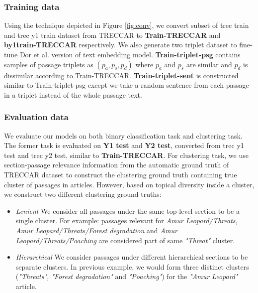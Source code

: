\documentclass[sigconf,authordraft]{acmart}
\begin{document}

\subsubsection{Training data} Using the technique depicted in Figure \ref{fig:conv}, we convert subset of trec train and trec y1 train dataset from TRECCAR to \textbf{Train-TRECCAR} and \textbf{by1train-TRECCAR} respectively. We also generate two triplet dataset to fine-tune Dor et al. version of text embedding model. \textbf{Train-triplet-psg} contains samples of passage triplets as $(p_a, p_s, p_d)$ where $p_a$ and $p_s$ are similar and $p_d$ is dissimilar according to Train-TRECCAR. \textbf{Train-triplet-sent} is constructed similar to Train-triplet-psg except we take a random sentence from each passage in a triplet instead of the whole passage text. 

\subsubsection{Evaluation data} We evaluate our models on both binary classification task and clustering task. The former task is evaluated on \textbf{Y1 test} and \textbf{Y2 test}, converted from trec y1 test and trec y2 test, similar to \textbf{Train-TRECCAR}. For clustering task, we use section-passage relevance information from the automatic ground truth of TRECCAR dataset to construct the clustering ground truth containing true cluster of passages in articles. However, based on topical diversity inside a cluster, we construct two different clustering ground truths:

\begin{itemize}
    \item \textit{Lenient} We consider all passages under the same top-level section to be a single cluster. For example: passages relevant for \textit{Amur Leopard/Threats}, \textit{Amur Leopard/Threats/Forest degradation} and \textit{Amur Leopard/Threats/Poaching} are considered part of same \textit{"Threat"} cluster.
    \item \textit{Hierarchical} We consider passages under different hierarchical sections to be separate clusters. In previous example, we would form three distinct clusters (\textit{"Threats", "Forest degradation"} and \textit{"Poaching"}) for the \textit{"Amur Leopard"} article.
\end{itemize}
\end{document}
